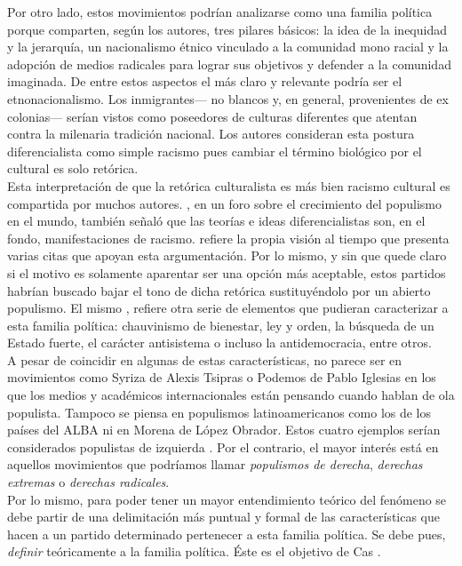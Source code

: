 Por otro lado, estos movimientos podrían analizarse como una familia política porque comparten, según los autores, tres pilares básicos: la idea de la inequidad y la jerarquía, un nacionalismo étnico vinculado a la comunidad mono racial y la adopción de medios radicales para lograr sus objetivos y defender a la comunidad imaginada. De entre estos aspectos el más claro y relevante podría ser el etnonacionalismo. Los inmigrantes--- no blancos y, en general, provenientes de ex colonias--- serían vistos como poseedores de culturas diferentes que atentan contra la milenaria tradición nacional. Los autores consideran esta postura diferencialista como simple racismo pues cambiar el término biológico por el cultural es solo retórica.\\

Esta interpretación de que la retórica culturalista es más bien racismo cultural es compartida por muchos autores. \textcite{Goodliffe17}, en un foro sobre el crecimiento del populismo en el mundo, también señaló que las teorías e ideas diferencialistas son, en el fondo, manifestaciones de racismo.  \textcite{Hainsworth16a} refiere la propia visión al tiempo que presenta varias citas que apoyan esta argumentación. Por lo mismo, y sin que quede claro si el motivo es solamente aparentar ser una opción más aceptable, estos partidos habrían buscado bajar el tono de dicha retórica sustituyéndolo por un abierto populismo. El mismo \textcite{Hainsworth16a}, refiere otra serie de elementos que pudieran caracterizar a esta familia política: chauvinismo de bienestar, ley y orden, la búsqueda de un Estado fuerte, el carácter antisistema o incluso la antidemocracia, entre otros.\\ 

A pesar de coincidir en algunas de estas características, no parece ser en movimientos como Syriza de Alexis Tsipras o Podemos de Pablo Iglesias en los que los medios y académicos internacionales están pensando cuando hablan de ola populista. Tampoco se piensa en populismos latinoamericanos como los de los países del ALBA ni en Morena de López Obrador. Estos cuatro ejemplos serían considerados populistas de izquierda \parencite{MuddeRovira17}. Por el contrario, el mayor interés está en aquellos movimientos que podríamos llamar \textit{populismos de derecha}, \textit{derechas extremas} o \textit{derechas radicales}.\\

Por lo mismo, para poder tener un mayor entendimiento teórico del fenómeno se debe partir de una delimitación más puntual y formal de las características que hacen a un partido determinado pertenecer a esta familia política. Se debe pues, \textit{definir} teóricamente a la familia política. Éste es el objetivo de Cas \textcite{Mudde07a}. 

